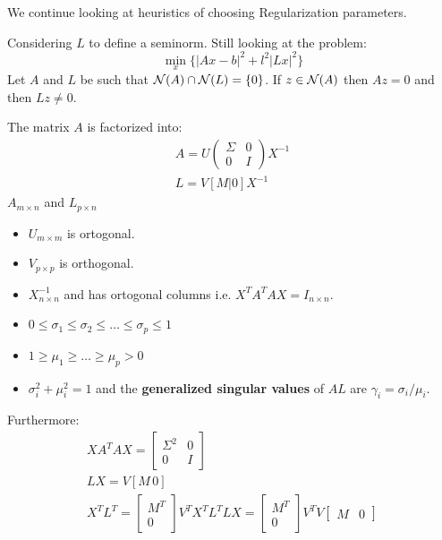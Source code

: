 We continue looking at heuristics of choosing Regularization parameters.

Considering $L$ to define a seminorm. Still looking at the problem:
$$ \min_x \{|Ax-b|^2 + l^2 |Lx|^2 \}$$
Let $A$ and $L$ be such that $\mathcal{N}(A)\cap \mathcal{N}(L)=\{0\}$. If $z\in \mathcal{N}(A)$ then $Az=0$ and then $Lz\neq 0$.

\begin{ddef}
The matrix $A$ is factorized into:
\begin{gather}
A = U\begin{pmatrix} \Sigma & 0 \\ 0 & I \end{pmatrix} X ^{-1}    \\
L= V[M | 0 ] X ^{-1}    
\end{gather}
$A_{m\times n}$ and $L_{p\times n}$ 
\begin{itemize}
\item  $U_{m\times m}$ is ortogonal.
\item $V_{p\times p}$ is orthogonal.
\item  $X ^{-1}_{n\times n} $ and has ortogonal columns i.e. $X^TA^T A X=I_{n\times n}$.
\item $0\leq \sigma_1 \leq \sigma_2 \leq \ldots \leq \sigma_p \leq 1$
\item $1\geq \mu_1 \geq \ldots \geq \mu_p > 0 $
\item $\sigma_i^2 + \mu_i^2=1$ and the \textbf{generalized singular values} of $AL$ are $\gamma_i = \sigma_i/\mu_i$.
\end{itemize}
\end{ddef}

Furthermore:
\begin{gather*}
XA^TAX= \begin{bmatrix}
\Sigma^2 & 0 \\
0     & I 
\end{bmatrix} \\
LX = V[M\, 0] \\
X^TL^T = \begin{bmatrix}
M^T \\ 0 \end{bmatrix} V^T 
X^T L^T L X = \begin{bmatrix}
M^T \\ 0 \end{bmatrix} V^T V \begin{bmatrix} M & 0 \end{bmatrix} 
\end{gather*}

